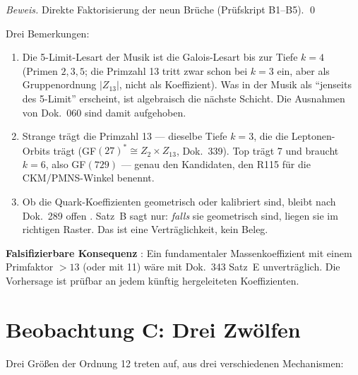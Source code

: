 \emph{Beweis.} Direkte Faktorisierung der neun Brüche
(Prüfskript B1--B5). \qed

Drei Bemerkungen:

\begin{enumerate}
\item Die 5-Limit-Lesart der Musik ist die Galois-Lesart bis zur Tiefe
  $k=4$ (Primen $2,3,5$; die Primzahl 13 tritt zwar schon bei $k=3$ ein,
  aber als Gruppenordnung $|Z_{13}|$, nicht als Koeffizient). Was in der
  Musik als ``jenseits des 5-Limit'' erscheint, ist algebraisch die
  nächste Schicht. Die Ausnahmen von Dok.~060 sind damit aufgehoben.
\item Strange trägt die Primzahl 13 --- dieselbe Tiefe $k=3$, die die
  Leptonen-Orbits trägt (GF$(27)^*\cong Z_2\times Z_{13}$, Dok.~339).
  Top trägt 7 und braucht $k=6$, also GF$(729)$ --- genau den Kandidaten,
  den R115 für die CKM/PMNS-Winkel benennt.
\item Ob die Quark-Koeffizienten geometrisch oder kalibriert sind, bleibt
  nach Dok.~289 offen \SM. Satz~B sagt nur: \emph{falls} sie geometrisch
  sind, liegen sie im richtigen Raster. Das ist eine Verträglichkeit,
  kein Beleg.
\end{enumerate}

\textbf{Falsifizierbare Konsequenz} \KM: Ein fundamentaler
Massenkoeffizient mit einem Primfaktor $>13$ (oder mit 11) wäre mit
Dok.~343 Satz~E unverträglich. Die Vorhersage ist prüfbar an jedem
künftig hergeleiteten Koeffizienten.

\section{Beobachtung C: Drei Zwölfen}

Drei Größen der Ordnung 12 treten auf, aus drei verschiedenen Mechanismen:


